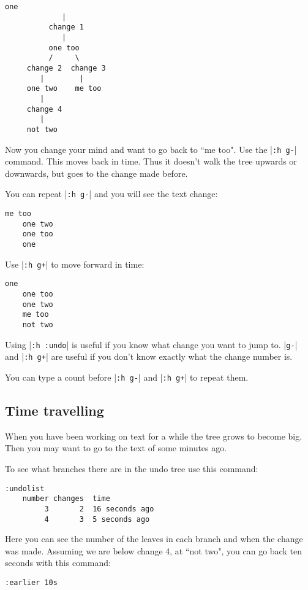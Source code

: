 \begin{Verbatim}[samepage=true]
            one
             |
          change 1
             |
          one too
          /     \
     change 2  change 3
        |        |
     one two    me too
        |
     change 4
        |
     not two
\end{Verbatim}

Now you change your mind and want to go back to ``me too".
Use the |\texttt{:h g-}| command.
This moves back in time.
Thus it doesn't walk the tree upwards or downwards, but goes to the change made before.

You can repeat |\texttt{:h g-}| and you will see the text change:

\begin{Verbatim}[samepage=true]
    me too
    one two
    one too
    one
\end{Verbatim}

Use |\texttt{:h g+}| to move forward in time:

\begin{Verbatim}[samepage=true]
    one
    one too
    one two
    me too
    not two
\end{Verbatim}

Using |\texttt{:h :undo}| is useful if you know what change you want to jump to.
|\texttt{g-}| and |\texttt{:h g+}| are useful if you don't know exactly what the change number is.

You can type a count before |\texttt{:h g-}| and |\texttt{:h g+}| to repeat them.
\subsection{Time travelling}
When you have been working on text for a while the tree grows to become big.
Then you may want to go to the text of some minutes ago.

To see what branches there are in the undo tree use this command:

\begin{Verbatim}[samepage=true]
 :undolist
    number changes  time
         3       2  16 seconds ago
         4       3  5 seconds ago
\end{Verbatim}

Here you can see the number of the leaves in each branch and when the change was made.
Assuming we are below change 4, at ``not two", you can go back ten seconds with this command:

\begin{Verbatim}[samepage=true]
 :earlier 10s
\end{Verbatim}

